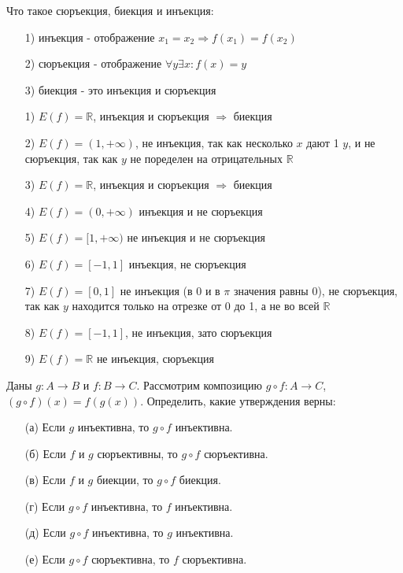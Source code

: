 \documentclass{article}
\begin{document}
\begin{solution}[4]
Что такое сюръекция, биекция и инъекция:
\begin{enumerate}
\item[1)] инъекция - отображение $x_1 = x_2 \Rightarrow f(x_1) = f(x_2)$
\item[2)] сюръекция - отображение $\forall y \exists x: f(x) = y$
\item[3)] биекция - это инъекция и сюръекция
\end{enumerate}
\begin{enumerate}
\item[1)] $E(f)=\mathbb{R}$, инъекция и сюръекция $\Rightarrow$ биекция
\item[2)] $E(f)=(1, +\infty)$, не инъекция, так как несколько $x$ дают 1 $y$, и не сюръекция, так как $y$ не поределен на отрицательных $\mathbb{R}$
\item[3)] $E(f)=\mathbb{R}$, инъекция и сюръекция $\Rightarrow$ биекция
\item[4)] $E(f)=(0, +\infty)$ инъекция и не сюръекция
\item[5)] $E(f)=[1, +\infty)$ не инъекция и не сюръекция
\item[6)] $E(f)=[-1, 1]$ инъекция, не сюръекция
\item[7)] $E(f)=[0, 1]$ не инъекция (в 0 и в $\pi$ значения равны 0), не сюръекция, так как $y$ находится только на отрезке от 0 до 1, а не во всей $\mathbb{R}$ 
\item[8)] $E(f)=[-1, 1]$, не инъекция, зато сюръекция
\item[9)] $E(f)=\mathbb{R}$ не инъекция, сюръекция
\end{enumerate}
\end{solution}
\begin{task}[2]
Даны $g : A \to B$ и $f : B \to C$. Рассмотрим композицию $g\circ f : A \to C$, $(g\circ f)(x)=f(g(x))$. Определить, какие утверждения верны:
\begin{enumerate}
    \item[(а)] Если $g$ инъективна, то $g\circ f$ инъективна.
    \item[(б)] Если $f$ и $g$ сюръективны, то $g\circ f$ сюръективна.
    \item[(в)] Если $f$ и $g$ биекции, то $g\circ f$ биекция.
    \item[(г)] Если $g\circ f$ инъективна, то $f$ инъективна.
    \item[(д)] Если $g\circ f$ инъективна, то $g$ инъективна.
    \item[(е)] Если $g\circ f$ сюръективна, то $f$ сюръективна.
\end{enumerate}
\end{task}
\end{document}

